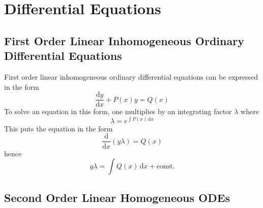 \documentclass{article}
\newcommand{\de}{\textrm{d}}
\begin{document}
\section{Differential Equations}

\subsection{First Order Linear Inhomogeneous Ordinary Differential Equations}

First order linear inhomogeneous ordinary differential equations can be
expressed in the form \[\frac{\de y}{\de x} + P(x)y = Q(x)\] To solve an
equation in this form, one multiplies by an integrating factor $\lambda$ where
\[\lambda = e ^ {\int \! P(x) \, \de x}\] This puts the equation in the form
\[\frac{\de}{\de x}\left(y\lambda\right) = Q(x)\] hence \[y\lambda = \int \!
    Q(x) \, \de x + \textrm{const.}\]

\subsection{Second Order Linear Homogeneous ODEs}
\end{document}
